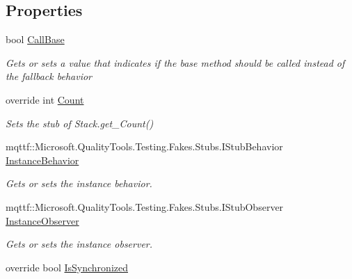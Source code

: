 \subsection*{Properties}
\begin{DoxyCompactItemize}
\item 
bool \hyperlink{class_system_1_1_collections_1_1_fakes_1_1_stub_stack_a6168e2a58d36ffe157975e02aedf7a15}{Call\-Base}
\begin{DoxyCompactList}\small\item\em Gets or sets a value that indicates if the base method should be called instead of the fallback behavior\end{DoxyCompactList}\item 
override int \hyperlink{class_system_1_1_collections_1_1_fakes_1_1_stub_stack_ab864e9949f485c113d49cdecdaf36302}{Count}
\begin{DoxyCompactList}\small\item\em Sets the stub of Stack.\-get\-\_\-\-Count()\end{DoxyCompactList}\item 
mqttf\-::\-Microsoft.\-Quality\-Tools.\-Testing.\-Fakes.\-Stubs.\-I\-Stub\-Behavior \hyperlink{class_system_1_1_collections_1_1_fakes_1_1_stub_stack_aa1ddc2986aea492c51ff79103178b9b0}{Instance\-Behavior}
\begin{DoxyCompactList}\small\item\em Gets or sets the instance behavior.\end{DoxyCompactList}\item 
mqttf\-::\-Microsoft.\-Quality\-Tools.\-Testing.\-Fakes.\-Stubs.\-I\-Stub\-Observer \hyperlink{class_system_1_1_collections_1_1_fakes_1_1_stub_stack_a4ba4d10a89530136db322800567a2f18}{Instance\-Observer}
\begin{DoxyCompactList}\small\item\em Gets or sets the instance observer.\end{DoxyCompactList}\item 
override bool \hyperlink{class_system_1_1_collections_1_1_fakes_1_1_stub_stack_ae5c917c678deb4fcb934904973f27128}{Is\-Synchronized}

\end{DoxyCompactItemize}
